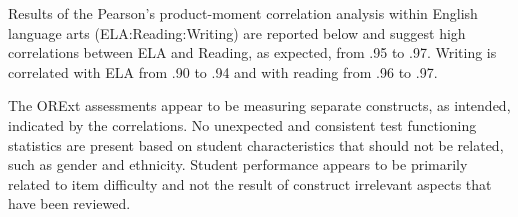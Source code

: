 \documentclass[]{article}
\begin{document}
\FloatBarrier

Results of the Pearson's product-moment correlation analysis within
English language arts (ELA:Reading:Writing) are reported below and
suggest high correlations between ELA and Reading, as expected, from .95
to .97. Writing is correlated with ELA from .90 to .94 and with reading
from .96 to .97.

The ORExt assessments appear to be measuring separate constructs, as
intended, indicated by the correlations. No unexpected and consistent
test functioning statistics are present based on student characteristics
that should not be related, such as gender and ethnicity. Student
performance appears to be primarily related to item difficulty and not
the result of construct irrelevant aspects that have been reviewed.
\end{document}
